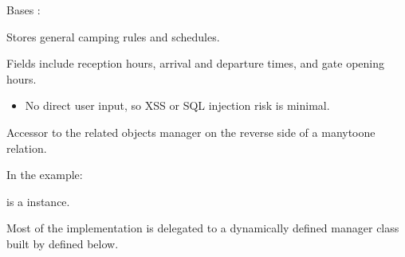 \documentclass[letterpaper,10pt,french]{sphinxmanual}
\begin{document}
\begin{fulllineitems}
\label{\detokenize{index:core.models.CampingInfo}}
\pysigstartsignatures
\pysiglinewithargsret
{}
{\sphinxparamcomma {}}
{}
\pysigstopsignatures
\sphinxAtStartPar
Bases : 

\sphinxAtStartPar
Stores general camping rules and schedules.

\sphinxAtStartPar
Fields include reception hours, arrival and departure times, and gate opening hours.
\begin{description}
\begin{itemize}
\item {} 
\sphinxAtStartPar
No direct user input, so XSS or SQL injection risk is minimal.

\end{itemize}

\end{description}

\begin{fulllineitems}
\label{\detokenize{index:core.models.CampingInfo.translations}}
\pysigstartsignatures
\pysigline
{}
\pysigstopsignatures
\sphinxAtStartPar
Accessor to the related objects manager on the reverse side of a
many\sphinxhyphen{}to\sphinxhyphen{}one relation.

\sphinxAtStartPar
In the example:

\begin{sphinxVerbatim}[commandchars=\\\{\}]
       
\end{sphinxVerbatim}

\sphinxAtStartPar
{} is a  instance.

\sphinxAtStartPar
Most of the implementation is delegated to a dynamically defined manager
class built by  defined below.


\end{fulllineitems}
\end{fulllineitems}
\end{document}
